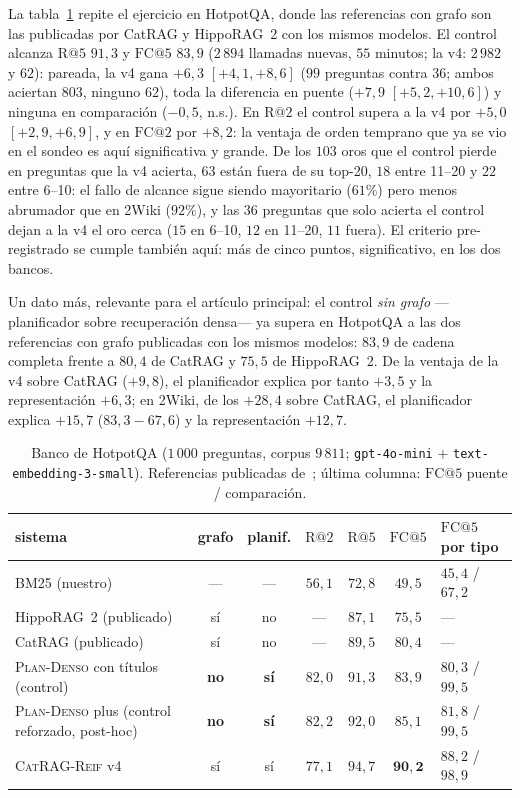 \documentclass[11pt,a4paper]{article}
\newcommand{\sys}{\textsc{CatRAG-Reif}}
\newcommand{\hippo}{HippoRAG~2}
\newcommand{\ctrl}{\textsc{Plan-Denso}}
\begin{document}
La tabla~\ref{tab:bancohotpot} repite el ejercicio en HotpotQA, donde las
referencias con grafo son las publicadas por CatRAG y \hippo{} con los
mismos modelos. El control alcanza $\mathrm{R@}5$ $91{,}3$ y
$\mathrm{FC@}5$ $83{,}9$ ($2\,894$ llamadas nuevas, $55$ minutos; la v4:
$2\,982$ y $62$): pareada, la v4 gana $+6{,}3$ $[+4{,}1,+8{,}6]$ ($99$
preguntas contra $36$; ambos aciertan $803$, ninguno $62$), toda la
diferencia en puente ($+7{,}9$ $[+5{,}2,+10{,}6]$) y ninguna en comparación
($-0{,}5$, n.s.). En $\mathrm{R@}2$ el control supera a la v4 por $+5{,}0$
$[+2{,}9,+6{,}9]$, y en $\mathrm{FC@}2$ por $+8{,}2$: la ventaja de orden
temprano que ya se vio en el sondeo es aquí significativa y grande. De los
$103$ oros que el control pierde en preguntas que la v4 acierta, $63$
están fuera de su top-20, $18$ entre 11--20 y $22$ entre 6--10: el fallo de
alcance sigue siendo mayoritario ($61\%$) pero menos abrumador que en 2Wiki
($92\%$), y las $36$ preguntas que solo acierta el control dejan a la v4
el oro cerca ($15$ en 6--10, $12$ en 11--20, $11$ fuera). El criterio
pre-registrado se cumple también aquí: más de cinco puntos, significativo,
en los dos bancos.

Un dato más, relevante para el artículo principal: el control \emph{sin
grafo} ---planificador sobre recuperación densa--- ya supera en HotpotQA
a las dos referencias con grafo publicadas con los mismos modelos: $83{,}9$
de cadena completa frente a $80{,}4$ de CatRAG y $75{,}5$ de \hippo{}. De la
ventaja de la v4 sobre CatRAG ($+9{,}8$), el planificador explica por tanto
$+3{,}5$ y la representación $+6{,}3$; en 2Wiki, de los $+28{,}4$ sobre
CatRAG, el planificador explica $+15{,}7$ ($83{,}3 - 67{,}6$) y la
representación $+12{,}7$.

\begin{table}[t]
\centering\footnotesize\setlength{\tabcolsep}{4pt}
\caption{Banco de HotpotQA ($1\,000$ preguntas, corpus $9\,811$;
\texttt{gpt-4o-mini} + \texttt{text-embedding-3-small}). Referencias
publicadas de~\cite{catrag}; última columna: $\mathrm{FC@}5$ puente /
comparación.}
\label{tab:bancohotpot}
\begin{tabular}{lcccccl}
\toprule
sistema & grafo & planif. & $\mathrm{R@}2$ & $\mathrm{R@}5$ & $\mathrm{FC@}5$ & $\mathrm{FC@}5$ por tipo\\
\midrule
BM25 (nuestro) & --- & --- & $56{,}1$ & $72{,}8$ & $49{,}5$ & $45{,}4$ / $67{,}2$\\
\hippo{} (publicado) & sí & no & --- & $87{,}1$ & $75{,}5$ & ---\\
CatRAG (publicado) & sí & no & --- & $89{,}5$ & $80{,}4$ & ---\\
\ctrl{} con títulos (control) & \textbf{no} & \textbf{sí} & $82{,}0$ & $91{,}3$ & $83{,}9$ & $80{,}3$ / $99{,}5$\\
\ctrl{} plus (control reforzado, post-hoc) & \textbf{no} & \textbf{sí} & $82{,}2$ & $92{,}0$ & $85{,}1$ & $81{,}8$ / $99{,}5$\\
\sys{} v4 & sí & sí & $77{,}1$ & $94{,}7$ & $\mathbf{90{,}2}$ & $88{,}2$ / $98{,}9$\\
\bottomrule
\end{tabular}
\end{table}
\end{document}
